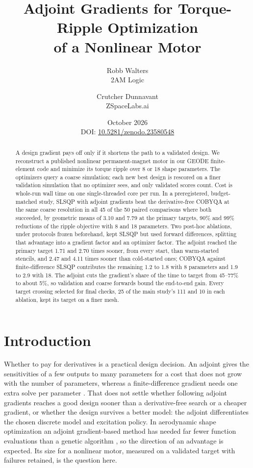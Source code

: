 \documentclass{anvil-paper}
\title{Adjoint Gradients for Torque-Ripple Optimization\\of a Nonlinear Motor}
\author{Robb Walters\\
  {\normalsize 2AM Logic}
  \and Crutcher Dunnavant\\
  {\normalsize ZSpaceLabs.ai}}
\date{October 2026\\[0.5ex]
  {\normalsize DOI: \href{https://doi.org/10.5281/zenodo.23580548}{10.5281/zenodo.23580548}}}
\begin{document}
\maketitle
\begin{abstract}
A design gradient pays off only if it shortens the path to a validated
design. We reconstruct a published nonlinear
permanent-magnet motor in our GEODE finite-element code and minimize its
torque ripple over 8 or 18 shape parameters. The optimizers query a coarse
simulation; each new best design is rescored on a finer validation
simulation that no optimizer sees, and only validated scores count. Cost is
whole-run wall time on one single-threaded core per run. In a
preregistered, budget-matched study, SLSQP with adjoint gradients beat the
derivative-free COBYQA at the same coarse resolution in all 45 of the 50
paired comparisons where both succeeded, by geometric means of 3.10 and
7.79 at the primary targets, 90\% and 99\% reductions of the ripple
objective with 8 and 18 parameters. Two post-hoc ablations, under
protocols frozen beforehand, kept SLSQP but used forward differences,
splitting that advantage into a gradient factor and an optimizer factor.
The adjoint reached the primary target 1.71 and 2.70 times sooner, from
every start, than warm-started stencils, and 2.47 and 4.11 times sooner
than cold-started ones; COBYQA against
finite-difference SLSQP contributes the remaining 1.2 to 1.8 with 8
parameters and 1.9 to 2.9 with 18. The adjoint cuts the gradient's share
of the time to target from 45--77\% to about 5\%, so validation and
coarse forwards bound the end-to-end gain. Every target crossing
selected for final checks, 25 of the main study's 111 and 10 in each
ablation, kept its target on a finer mesh.
\end{abstract}

\section{Introduction}
Whether to pay for derivatives is a practical design decision. An adjoint
gives the sensitivities of a few outputs to many parameters for a cost
that does not grow with the number of parameters, whereas a
finite-difference gradient needs one extra solve per parameter
\citep{giles2000introduction,martins2013review}. That does not settle
whether following adjoint gradients reaches a good design sooner than a
derivative-free search or a cheaper gradient, or whether the design
survives a better model: the adjoint differentiates the chosen discrete
model and excitation policy. In aerodynamic shape optimization an adjoint
gradient-based method has needed far fewer function evaluations than a
genetic algorithm \citep{zingg2008comparative}, so the direction of an
advantage is expected. Its size for a nonlinear motor, measured on a
validated target with failures retained, is the question here.
\end{document}

